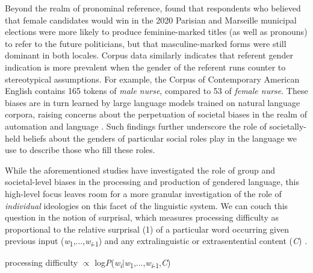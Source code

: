 \documentclass[10pt,letterpaper]{article}
\begin{document}
	Beyond the realm of pronominal reference, \textcite{pozniak2021failures} found that respondents who believed that female candidates would win in the 2020 Parisian and Marseille municipal elections were more likely to produce feminine-marked titles (as well as pronouns) to refer to the future politicians, but that masculine-marked forms were still dominant in both locales. Corpus data similarly indicates that referent gender indication is more prevalent when the gender of the referent runs counter to stereotypical assumptions. For example, the Corpus of Contemporary American English \parencite{coca} contains 165 tokens of \textit{male nurse}, compared to 53 of \textit{female nurse}. These biases are in turn learned by large language models trained on natural language corpora, raising concerns about the perpetuation of societal biases in the realm of automation and language \parencite{caliskan2017semantics,bender2021dangers,sutton2018biased}. Such findings further underscore the role of societally-held beliefs about the genders of particular social roles play in the language we use to describe those who fill these roles.\par 
	While the aforementioned studies have investigated the role of group and societal-level biases in the processing and production of gendered language, this high-level focus leaves room for a more granular investigation of the role of \textit{individual} ideologies on this facet of the linguistic system. We can couch this question in the notion of surprisal, which measures processing difficulty as proportional to the relative surprisal (1) of a particular word occurring given previous input (\textit{w}\textsubscript{1},...,\textit{w}\textsubscript{\textit{i}-1}) and any extralinguistic or extrasentential content (\textit{C}) \parencite{levy2008expectation}.
	
	\begin{exe}
		\item processing difficulty $\propto$ log\textit{P}(\textit{w}\textsubscript{\textit{i}}$|$\textit{w}\textsubscript{1},...,\textit{w}\textsubscript{\textit{i}-1},\textit{C})
	\end{exe}
	
\end{document}
